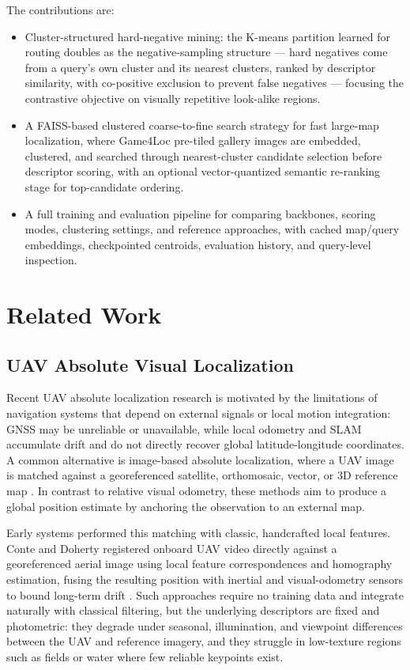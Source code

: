 \documentclass[conference]{IEEEtran}
\begin{document}
The contributions are:
\begin{itemize}
    \item Cluster-structured hard-negative mining: the K-means partition
    learned for routing doubles as the negative-sampling structure — hard
    negatives come from a query's own cluster and its nearest clusters,
    ranked by descriptor similarity, with co-positive exclusion to prevent
    false negatives — focusing the contrastive objective on visually
    repetitive look-alike regions.
    \item A FAISS-based clustered coarse-to-fine search strategy for fast
    large-map localization, where Game4Loc pre-tiled gallery images are
    embedded, clustered, and searched through nearest-cluster candidate
    selection before descriptor scoring, with an optional vector-quantized
    semantic re-ranking stage for top-candidate ordering.
    \item A full training and evaluation pipeline for comparing backbones,
    scoring modes, clustering settings, and reference approaches, with cached
    map/query embeddings, checkpointed centroids, evaluation
    history, and query-level inspection.
\end{itemize}

\section{Related Work}
\subsection{UAV Absolute Visual Localization}
Recent UAV absolute localization research is motivated by the limitations of
navigation systems that depend on external signals or local motion integration:
GNSS may be unreliable or unavailable, while local odometry and SLAM
accumulate drift and do not directly recover global latitude-longitude
coordinates. A common alternative is image-based absolute localization, where
a UAV image is matched against a georeferenced satellite, orthomosaic, vector,
or 3D reference map \cite{liu2024review}. In contrast to relative visual
odometry, these methods aim to produce a global position estimate by anchoring
the observation to an external map.

Early systems performed this matching with classic, handcrafted local
features. Conte and Doherty registered onboard UAV video directly against a
georeferenced aerial image using local feature correspondences and
homography estimation, fusing the resulting position with inertial and
visual-odometry sensors to bound long-term drift \cite{conte2008integrated}.
Such approaches require no training data and integrate naturally with
classical filtering, but the underlying descriptors are fixed and
photometric: they degrade under seasonal, illumination, and viewpoint
differences between the UAV and reference imagery, and they struggle in
low-texture regions such as fields or water where few reliable keypoints
exist.
\end{document}
